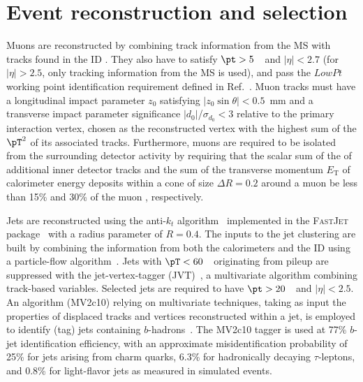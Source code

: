 \documentclass[cernpreprint, backref=false, texlive=2020, UKenglish, dvipsnames, block=none, texmf]{atlasdoc}
\begin{document}
 
 
\section{Event reconstruction and selection}
 
 
Muons are reconstructed by combining track information from the MS with tracks found in the ID \cite{MUON-2018-0333}. They also have to satisfy $\pt>5$~\GeV\ and $|\eta|<2.7$ (for $|\eta|>2.5$, only tracking information from the MS is used), and pass the $LowPt$ working point identification requirement defined in Ref.~\cite{MUON-2018-0333}.
Muon tracks must have a longitudinal impact parameter $z_0$ satisfying $|z_{0}\sin\theta|<0.5$~mm and a transverse impact parameter significance $|d_{0}|$/$\sigma_{d_{0}}<3$ relative to the primary interaction vertex, chosen as the reconstructed vertex with the highest sum of the $\pT^2$ of its associated tracks. Furthermore, muons are required to be isolated from the surrounding detector activity by requiring that the scalar sum of the \pt of additional inner detector tracks  and the sum of the  transverse momentum $E_\mathrm{T}$ of calorimeter energy deposits within a cone of size $\Delta R = 0.2$ around a muon be less than 15\% and 30\% of the muon \pt, respectively.
 
 
Jets are reconstructed using the anti-$k_t$ algorithm~\cite{Cacciari:2008gp} implemented in the \textsc{FastJet}\xspace package~\cite{Fastjet} with a radius parameter of $R = 0.4$. The inputs to the jet clustering are built by combining the information from both the calorimeters and the ID using a particle-flow algorithm~\cite{PERF-2015-09,JETM-2018-05}. Jets with $\pT < 60$~\GeV\ originating from pileup are suppressed with the jet-vertex-tagger (JVT)~\cite{ATLAS-CONF-2014-018}, a multivariate algorithm combining track-based variables. Selected jets are required to have $\pt > 20$~\GeV\ and $|\eta| <2.5$.
An algorithm (MV2c10) relying on multivariate techniques, taking as input the properties of displaced tracks and vertices reconstructed within a jet, is employed to identify (tag) jets containing $b$-hadrons~\cite{FTAG-2018-01}.
The MV2c10 tagger is used at 77\% $b$-jet identification efficiency, with an approximate misidentification probability of 25\% for jets arising from charm quarks, 6.3\% for hadronically decaying $\tau$-leptons, and 0.8\% for light-flavor jets as measured in simulated \ttbar events.
 
\end{document}
